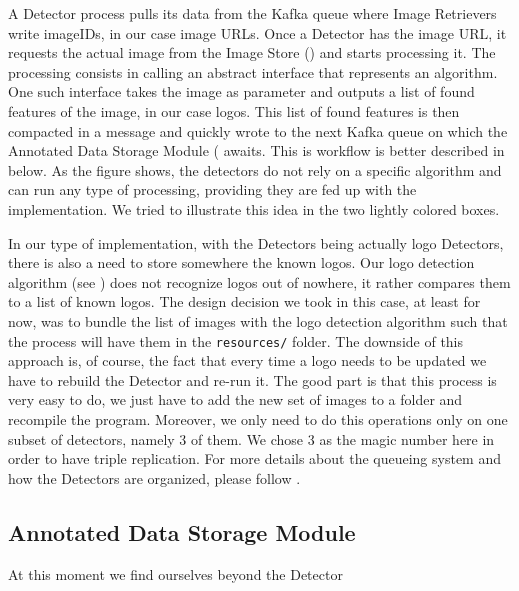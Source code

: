 A Detector process pulls its data from the Kafka queue where Image Retrievers
write imageIDs, in our case image URLs. Once a Detector has the image URL, it
requests the actual image from the Image Store
() and starts processing it. The
processing consists in calling an abstract interface that represents an
algorithm. One such interface takes the image as parameter and outputs a list
of found features of the image, in our case logos. This list of found features
is then compacted in a message and quickly wrote to the next Kafka queue on
which the Annotated Data Storage Module
( awaits. This is workflow is
better described in  below. As the figure
shows, the detectors do not rely on a specific algorithm and can
run any type of processing, providing they are fed up with the implementation.
We tried to illustrate this idea in the two lightly colored boxes.

In our type of implementation, with the Detectors being actually logo
Detectors, there is also a need to store somewhere the known logos. Our logo
detection algorithm (see ) does not
recognize logos out of nowhere, it rather compares them to a list of known
logos. The design decision we took in this case, at least for now, was to
bundle the list of images with the logo detection algorithm such that the
process will have them in the \texttt{resources/} folder. The downside of this
approach is, of course, the fact that every time a logo needs to be updated we
have to rebuild the Detector and re-run it. The good part is that this process
is very easy to do, we just have to add the new set of images to a folder
and recompile the program. Moreover, we only need to do this operations only
on one subset of detectors, namely 3 of them. We chose 3 as the magic number
here in order to have triple replication. For more details about the queueing
system and how the Detectors are organized, please follow
.

\subsection{Annotated Data Storage Module}
\label{sub-sec:ads-module}

At this moment we find ourselves beyond the Detector 

